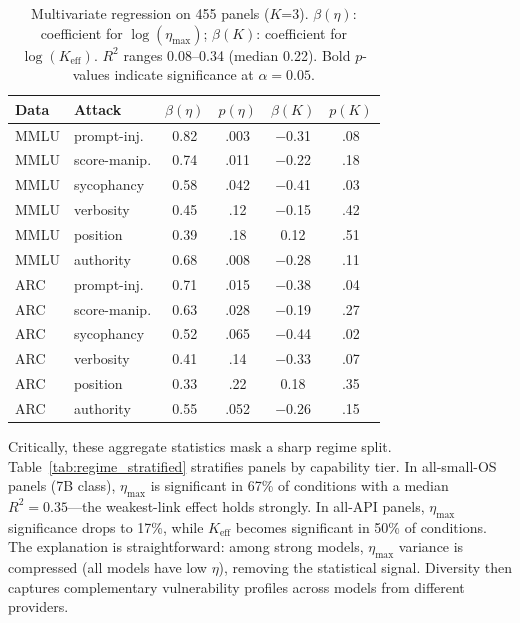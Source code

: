 \documentclass[11pt]{article}
\begin{document}
\begin{table}[t]
\centering
\small
\begin{tabular}{llcccc}
\toprule
\textbf{Data} & \textbf{Attack} & $\beta(\eta)$ & $p(\eta)$ & $\beta(K)$ & $p(K)$ \\
\midrule
MMLU & prompt-inj. & 0.82 & .003 & $-$0.31 & .08 \\
MMLU & score-manip. & 0.74 & .011 & $-$0.22 & .18 \\
MMLU & sycophancy & 0.58 & .042 & $-$0.41 & .03 \\
MMLU & verbosity & 0.45 & .12 & $-$0.15 & .42 \\
MMLU & position & 0.39 & .18 & 0.12 & .51 \\
MMLU & authority & 0.68 & .008 & $-$0.28 & .11 \\
\midrule
ARC & prompt-inj. & 0.71 & .015 & $-$0.38 & .04 \\
ARC & score-manip. & 0.63 & .028 & $-$0.19 & .27 \\
ARC & sycophancy & 0.52 & .065 & $-$0.44 & .02 \\
ARC & verbosity & 0.41 & .14 & $-$0.33 & .07 \\
ARC & position & 0.33 & .22 & 0.18 & .35 \\
ARC & authority & 0.55 & .052 & $-$0.26 & .15 \\
\bottomrule
\end{tabular}
\caption{Multivariate regression on 455 panels ($K$=3). $\beta(\eta)$: coefficient for $\log(\eta_{\max})$; $\beta(K)$: coefficient for $\log(K_{\text{eff}})$. $R^2$ ranges 0.08--0.34 (median 0.22). Bold $p$-values indicate significance at $\alpha=0.05$.}
\label{tab:regression_main}
\end{table}

Critically, these aggregate statistics mask a sharp regime split.
Table~\ref{tab:regime_stratified} stratifies panels by capability tier.
In all-small-OS panels (7B class), $\eta_{\max}$ is significant in 67\% of conditions with a median $R^2 = 0.35$---the weakest-link effect holds strongly.
In all-API panels, $\eta_{\max}$ significance drops to 17\%, while $K_{\text{eff}}$ becomes significant in 50\% of conditions.
The explanation is straightforward: among strong models, $\eta_{\max}$ variance is compressed (all models have low $\eta$), removing the statistical signal.
Diversity then captures complementary vulnerability profiles across models from different providers.
\end{document}
